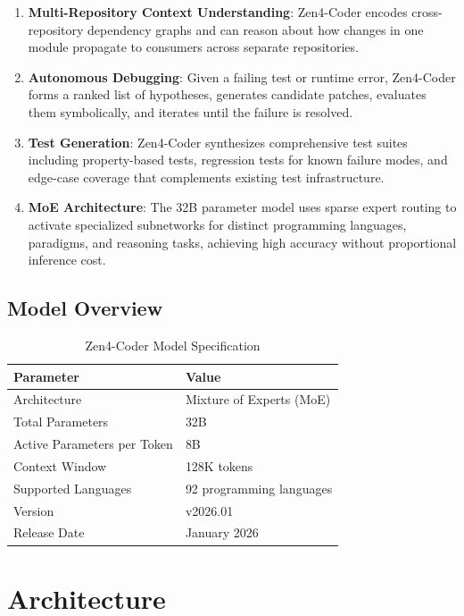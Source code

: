 \documentclass[11pt,a4paper]{article}
\begin{document}
\begin{enumerate}
  \item \textbf{Multi-Repository Context Understanding}: Zen4-Coder encodes cross-repository dependency graphs and can reason about how changes in one module propagate to consumers across separate repositories.
  \item \textbf{Autonomous Debugging}: Given a failing test or runtime error, Zen4-Coder forms a ranked list of hypotheses, generates candidate patches, evaluates them symbolically, and iterates until the failure is resolved.
  \item \textbf{Test Generation}: Zen4-Coder synthesizes comprehensive test suites including property-based tests, regression tests for known failure modes, and edge-case coverage that complements existing test infrastructure.
  \item \textbf{MoE Architecture}: The 32B parameter model uses sparse expert routing to activate specialized subnetworks for distinct programming languages, paradigms, and reasoning tasks, achieving high accuracy without proportional inference cost.
\end{enumerate}

\subsection{Model Overview}

\begin{table}[H]
\centering
\caption{Zen4-Coder Model Specification}
\begin{tabular}{ll}
\toprule
\textbf{Parameter} & \textbf{Value} \\
\midrule
Architecture & Mixture of Experts (MoE) \\
Total Parameters & 32B \\
Active Parameters per Token & 8B \\
Context Window & 128K tokens \\
Supported Languages & 92 programming languages \\
Version & v2026.01 \\
Release Date & January 2026 \\
\bottomrule
\end{tabular}
\end{table}

\section{Architecture}
\end{document}
